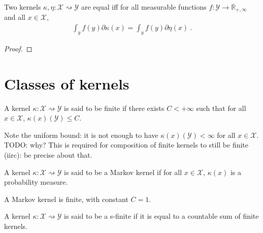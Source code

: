 \begin{theorem}
  \label{thm:kernel_ext}
  Two kernels $\kappa, \eta : \mathcal X \rightsquigarrow \mathcal Y$ are equal iff for all measurable functions $f : \mathcal Y \to \mathbb{R}_{+,\infty}$ and all $x \in \mathcal X$,
  \begin{align*}
  \int_y f(y) \partial \kappa(x) = \int_y f(y) \partial \eta(x) \: .
  \end{align*}
\end{theorem}

\begin{proof}\leanok
\uses{}

\end{proof}

\section{Classes of kernels}

\begin{definition}
  \label{def:finite_kernel}
  \leanok
  A kernel $\kappa : \mathcal X \rightsquigarrow \mathcal Y$ is said to be finite if there exists $C < +\infty$ such that for all $x \in \mathcal X$, $\kappa(x)(\mathcal Y) \le C$.
\end{definition}

Note the uniform bound: it is not enough to have $\kappa(x)(\mathcal Y) < \infty$ for all $x \in \mathcal X$. TODO: why? This is required for composition of finite kernels to still be finite (iirc): be precise about that.

\begin{definition}
  \label{def:markov_kernel}
  \leanok
  A kernel $\kappa : \mathcal X \rightsquigarrow \mathcal Y$ is said to be a Markov kernel if for all $x \in \mathcal X$, $\kappa(x)$ is a probability measure.
\end{definition}

A Markov kernel is finite, with constant $C = 1$.

\begin{definition}
  \label{def:sFinite_kernel}
  \leanok
  A kernel $\kappa : \mathcal X \rightsquigarrow \mathcal Y$ is said to be a s-finite if it is equal to a countable sum of finite kernels.
\end{definition}

